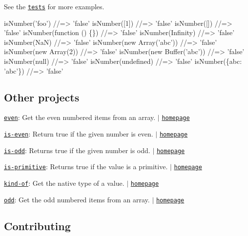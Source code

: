 See the \href{./test.js}{\tt tests} for more examples.


\begin{DoxyCode}
isNumber('foo')             //=> 'false'
isNumber([1])               //=> 'false'
isNumber([])                //=> 'false'
isNumber(function () \{\})    //=> 'false'
isNumber(Infinity)          //=> 'false'
isNumber(NaN)               //=> 'false'
isNumber(new Array('abc'))  //=> 'false'
isNumber(new Array(2))      //=> 'false'
isNumber(new Buffer('abc')) //=> 'false'
isNumber(null)              //=> 'false'
isNumber(undefined)         //=> 'false'
isNumber(\{abc: 'abc'\})      //=> 'false'
\end{DoxyCode}


\subsection*{Other projects}


\begin{DoxyItemize}
\item \href{https://www.npmjs.com/package/even}{\tt even}\+: Get the even numbered items from an array. $\vert$ \href{https://github.com/jonschlinkert/even}{\tt homepage}
\item \href{https://www.npmjs.com/package/is-even}{\tt is-\/even}\+: Return true if the given number is even. $\vert$ \href{https://github.com/jonschlinkert/is-even}{\tt homepage}
\item \href{https://www.npmjs.com/package/is-odd}{\tt is-\/odd}\+: Returns true if the given number is odd. $\vert$ \href{https://github.com/jonschlinkert/is-odd}{\tt homepage}
\item \href{https://www.npmjs.com/package/is-primitive}{\tt is-\/primitive}\+: Returns {\ttfamily true} if the value is a primitive. $\vert$ \href{https://github.com/jonschlinkert/is-primitive}{\tt homepage}
\item \href{https://www.npmjs.com/package/kind-of}{\tt kind-\/of}\+: Get the native type of a value. $\vert$ \href{https://github.com/jonschlinkert/kind-of}{\tt homepage}
\item \href{https://www.npmjs.com/package/odd}{\tt odd}\+: Get the odd numbered items from an array. $\vert$ \href{https://github.com/jonschlinkert/odd}{\tt homepage}
\end{DoxyItemize}

\subsection*{Contributing}

